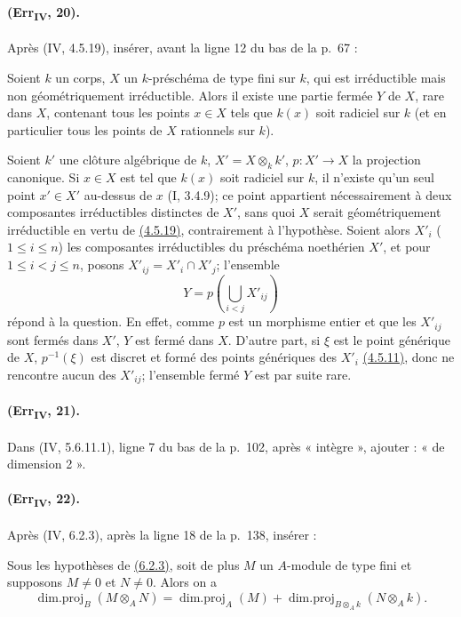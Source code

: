 \paragraph{(Err\textsubscript{IV}, 20).}
Après (IV, 4.5.19), insérer, avant la ligne 12 du bas de la p.~67 :

\begin{corollary}[4.5.19.3]
\label{IV.4.5.19.3}
Soient $k$ un corps, $X$ un $k$-préschéma de type fini sur $k$, qui est
irréductible mais non géométriquement irréductible. Alors il existe une
partie fermée $Y$ de $X$, rare dans $X$, contenant tous les points
$x\in X$ tels que $k(x)$ soit radiciel sur $k$ (et en particulier tous
les points de $X$ rationnels sur $k$).
\end{corollary}

Soient $k'$ une clôture algébrique de $k$, $X'=X\otimes_kk'$,
$p:X'\to X$ la projection canonique. Si $x\in X$ est tel que $k(x)$
soit radiciel sur $k$, il n'existe qu'un seul point $x'\in X'$ au-dessus
de $x$ (I, 3.4.9); ce point appartient nécessairement à deux composantes
irréductibles distinctes de $X'$, sans quoi $X$ serait géométriquement
irréductible en vertu de
{\hyperref[canon-index.ega4.c04.prop.4-5-19]{(4.5.19)}}, contrairement à
l'hypothèse. Soient alors $X'_i$ ($1\leq i\leq n$) les composantes
irréductibles du préschéma noethérien $X'$, et pour
$1\leq i<j\leq n$, posons $X'_{ij}=X'_i\cap X'_j$; l'ensemble
\[
 Y=p\left(\bigcup_{i<j}X'_{ij}\right)
\]
répond à la question. En effet, comme $p$ est un morphisme entier et
que les $X'_{ij}$ sont fermés dans $X'$, $Y$ est fermé dans $X$.
D'autre part, si $\xi$ est le point générique de $X$, $p^{-1}(\xi)$
est discret et formé des points génériques des $X'_i$
{\hyperref[canon-index.ega4.c04.cor.4-5-11]{(4.5.11)}}, donc ne rencontre aucun
des $X'_{ij}$; l'ensemble fermé $Y$ est par suite rare.

\paragraph{(Err\textsubscript{IV}, 21).}
Dans (IV, 5.6.11.1), ligne 7 du bas de la p.~102, après « intègre »,
ajouter : « de dimension 2 ».

\paragraph{(Err\textsubscript{IV}, 22).}
Après (IV, 6.2.3), après la ligne 18 de la p.~138, insérer :

\begin{proposition}[6.2.4]
\label{IV.6.2.4}
Sous les hypothèses de {\hyperref[canon-index.ega4.c04.prop.6-2-3]{(6.2.3)}}, soit
de plus $M$ un $A$-module de type fini et supposons $M\neq0$ et
$N\neq0$. Alors on a
\begin{equation}
 \operatorname{dim.proj}_B(M\otimes_AN)=
 \operatorname{dim.proj}_A(M)+
 \operatorname{dim.proj}_{B\otimes_Ak}(N\otimes_Ak).
 \label{IV.6.2.4.1}\tag{6.2.4.1}
\end{equation}
\end{proposition}

